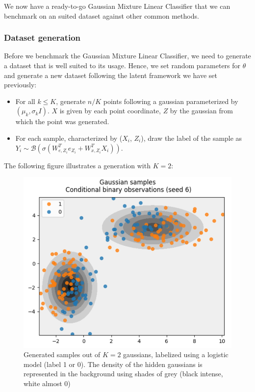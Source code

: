 We now have a ready-to-go Gaussian Mixture Linear Classifier that we can benchmark on an suited dataset against other common methods.

\subsubsection{Dataset generation}

Before we benchmark the Gaussian Mixture Linear Classifier, we need to generate a dataset that is well suited to its usage.
Hence, we set random parameters for $\theta$ and generate a new dataset following the latent framework we have set previously:
\begin{itemize}
    \item For all $k \leq K$, generate $n/K$ points following a gaussian parameterized by $(\mu_k, \sigma_k I)$.
    $X$ is given by each point coordinate, $Z$ by the gaussian from which the point was generated.
    \item For each sample, characterized by ($X_i$, $Z_i$), draw the label of the sample as $Y_i \sim \mathcal{B}(\sigma(W_{e,Z_i}^T e_{Z_i} + W_{x,Z_i} ^ T X_i))$.
\end{itemize}

The following figure illustrates a generation with $K=2$:
\begin{figure}[H]
    \center
    \includegraphics[scale=0.7]{images/samples_gmm_lc}
    \caption{Generated samples out of $K=2$ gaussians, labelized using a logistic model (label 1 or 0).
    The density of the hidden gaussians is represented in the background using shades of grey (black intense, white almost 0)}
    \label{fig:samples_gmm_lc}
\end{figure}

